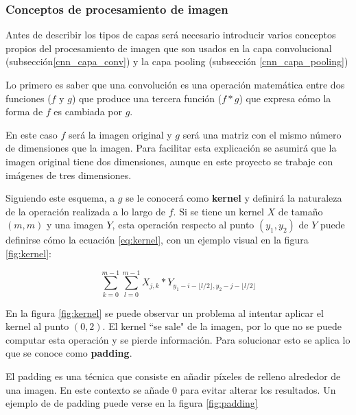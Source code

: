 \subsubsection{Conceptos de procesamiento de imagen}

Antes de describir los tipos de capas será necesario introducir varios conceptos propios del procesamiento de imagen que son usados en la capa convolucional (subsección\ref{cnn_capa_conv}) y la capa pooling (subsección \ref{cnn_capa_pooling})

Lo primero es saber que una convolución es una operación matemática entre dos funciones ($f$ y $g$) que produce una tercera función ($f*g$) que expresa cómo la forma de $f$ es cambiada por $g$. \cite{wikipedia_convolution}

En este caso $f$ será la imagen original y $g$ será una matriz con el mismo número de dimensiones que la imagen. Para facilitar esta explicación se asumirá que la imagen original tiene dos dimensiones, aunque en este proyecto se trabaje con imágenes de tres dimensiones.

Siguiendo este esquema, a $g$ se le conocerá como \textbf{kernel} y definirá la naturaleza de la operación realizada a lo largo de $f$. Si se tiene un kernel $X$ de tamaño $(m,m)$ y una imagen $Y$, esta operación respecto al punto $(y_1, y_2)$ de $Y$ puede definirse cómo la ecuación \ref{eq:kernel}, con un ejemplo visual en la figura \ref{fig:kernel}:

\begin{equation}\label{eq:kernel}
\sum_{k=0}^{m-1}\sum_{l=0}^{m-1} X_{j,k} * Y_{y_1 - i-\lfloor l/2 \rfloor, y_2 -  j -\lfloor l/2 \rfloor}
\end{equation}


En la figura \ref{fig:kernel} se puede observar un problema al intentar aplicar el kernel al punto $(0,2)$. El kernel ``se sale" de la imagen, por lo que no se puede computar esta operación y se pierde información. Para solucionar esto se aplica lo que se conoce como \textbf{padding}.

El padding es una técnica que consiste en añadir píxeles de relleno alrededor de una imagen. En este contexto se añade 0 para evitar alterar los resultados. Un ejemplo de de padding puede verse en la figura \ref{fig:padding}



